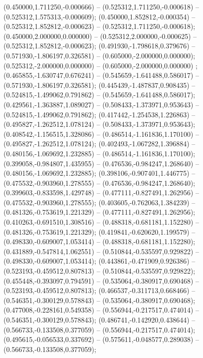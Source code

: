  (0.450000,1.711250,-0.000666) -- (0.525312,1.711250,-0.000618) -- (0.525312,1.575313,-0.000609);
 (0.450000,1.852812,-0.000354) -- (0.525312,1.852812,-0.000623) -- (0.525312,1.711250,-0.000618);
 (0.450000,2.000000,0.000000) -- (0.525312,2.000000,-0.000625) -- (0.525312,1.852812,-0.000623);
 (0.491930,-1.798618,0.379676) -- (0.571930,-1.806197,0.326581) -- (0.605000,-2.000000,0.000000);
 (0.525312,-2.000000,0.000000) -- (0.605000,-2.000000,0.000000) ;
 (0.465855,-1.630747,0.676241) -- (0.545659,-1.641488,0.586017) -- (0.571930,-1.806197,0.326581);
 (0.445439,-1.487837,0.908435) -- (0.524815,-1.499062,0.791862) -- (0.545659,-1.641488,0.586017);
 (0.429561,-1.363887,1.089027) -- (0.508433,-1.373971,0.953643) -- (0.524815,-1.499062,0.791862);
 (0.417442,-1.254538,1.226863) -- (0.495827,-1.262512,1.078124) -- (0.508433,-1.373971,0.953643);
 (0.408542,-1.156515,1.328086) -- (0.486514,-1.161836,1.170100) -- (0.495827,-1.262512,1.078124);
 (0.402493,-1.067282,1.396884) -- (0.480156,-1.069692,1.232885) -- (0.486514,-1.161836,1.170100);
 (0.399058,-0.984807,1.435955) -- (0.476536,-0.984247,1.268640) -- (0.480156,-1.069692,1.232885);
 (0.398106,-0.907401,1.446775) -- (0.475532,-0.903960,1.278555) -- (0.476536,-0.984247,1.268640);
 (0.399603,-0.833598,1.429748) -- (0.477111,-0.827491,1.262956) -- (0.475532,-0.903960,1.278555);
 (0.403605,-0.762063,1.384239) -- (0.481326,-0.753619,1.221329) -- (0.477111,-0.827491,1.262956);
 (0.410263,-0.691510,1.308516) -- (0.488318,-0.681181,1.152280) -- (0.481326,-0.753619,1.221329);
 (0.419841,-0.620620,1.199579) -- (0.498330,-0.609007,1.053414) -- (0.488318,-0.681181,1.152280);
 (0.431889,-0.547814,1.062551) -- (0.510844,-0.535597,0.929822) -- (0.498330,-0.609007,1.053414);
 (0.443861,-0.471909,0.926386) -- (0.523193,-0.459512,0.807813) -- (0.510844,-0.535597,0.929822);
 (0.455448,-0.393097,0.794591) -- (0.535064,-0.380917,0.690468) -- (0.523193,-0.459512,0.807813);
 (0.466537,-0.311713,0.668466) -- (0.546351,-0.300129,0.578843) -- (0.535064,-0.380917,0.690468);
 (0.477008,-0.228161,0.549358) -- (0.556944,-0.217517,0.474014) -- (0.546351,-0.300129,0.578843);
 (0.486741,-0.142920,0.438644) -- (0.566733,-0.133508,0.377059) -- (0.556944,-0.217517,0.474014);
 (0.495615,-0.056533,0.337692) -- (0.575611,-0.048577,0.289038) -- (0.566733,-0.133508,0.377059);
